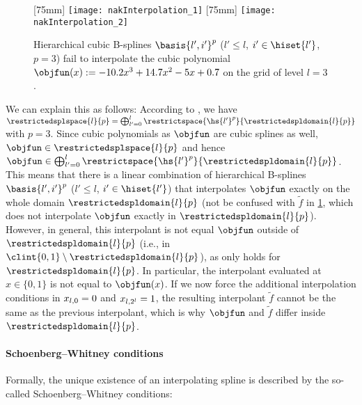 \begin{figure}
  [75mm]{%
    \texttt{[image: nakInterpolation\_1]}%
  }%
  \hfill%
  [75mm]{%
    \texttt{[image: nakInterpolation\_2]}%
  }%
  \caption{%
    Hierarchical cubic B-splines $\basis{l',i'}^p$
    ($l' \le l$, $i' \in \hiset{l'}$, $p = 3$)
    fail to interpolate the cubic polynomial
    $\objfun(x) := -10.2 x^3 + 14.7 x^2 - 5x + 0.7$
    on the grid of level $l = 3$.%
  }
  \label{fig:nakInterpolation}
\end{figure}

We can explain this as follows:
According to ,
we have $\restrictedsplspace{l}{p} = \bigoplus_{l'=0}^l \restrictspace{\hs{l'}^p}{\restrictedspldomain{l}{p}}$
with $p = 3$.
Since cubic polynomials as $\objfun$ are cubic splines as well,
$\objfun \in \restrictedsplspace{l}{p}$ and hence
$\objfun \in \bigoplus_{l'=0}^l \restrictspace{\hs{l'}^p}{\restrictedspldomain{l}{p}}$.
This means that there is a linear combination of hierarchical B-splines
$\basis{l',i'}^p$ ($l' \le l$, $i' \in \hiset{l'}$)
that interpolates $\objfun$ exactly on the whole domain $\restrictedspldomain{l}{p}$
(not be confused with $\tilde{f}$ in \cref{fig:nakInterpolation},
which does not interpolate $\objfun$ exactly in $\restrictedspldomain{l}{p}$).
However, in general, this interpolant is not equal $\objfun$ outside
of $\restrictedspldomain{l}{p}$ (i.e., in $\clint{0, 1} \setminus \restrictedspldomain{l}{p}$),
as  only holds for $\restrictedspldomain{l}{p}$.
In particular, the interpolant evaluated at $x \in \{0, 1\}$ is not
equal to $\objfun(x)$.
If we now force the additional interpolation conditions in
$x_{l,0} = 0$ and $x_{l,2^l} = 1$,
the resulting interpolant $\tilde{f}$ cannot be the same as the previous
interpolant,
which is why $\objfun$ and $\tilde{f}$ differ inside $\restrictedspldomain{l}{p}$.

\paragraph{Schoenberg--Whitney conditions}

Formally, the unique existence of an interpolating spline is
described by the so-called Schoenberg--Whitney conditions:

